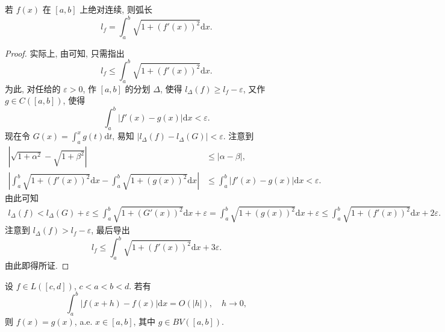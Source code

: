 \documentclass[../../main.tex]{subfiles}%
\begin{document}
\begin{example}
若 $f(x)$ 在 $[a,b]$ 上绝对连续, 则弧长
\[
l_f = \int_a^b \sqrt{1+(f'(x))^2}\mathrm{d}x.
\]
\end{example}
\begin{proof}
实际上, 由可知, 只需指出
\[
l_f \leqslant \int_a^b \sqrt{1+(f'(x))^2}\mathrm{d}x.
\]
为此, 对任给的 $\varepsilon>0$, 作 $[a,b]$ 的分划 $\Delta$, 使得 $l_\Delta(f)\geqslant l_f-\varepsilon$, 又作 $g\in C([a,b])$, 使得
\[
\int_a^b |f'(x)-g(x)|\mathrm{d}x < \varepsilon.
\]
现在令 $G(x) = \int_a^x g(t)\mathrm{d}t$, 易知 $|l_\Delta(f)-l_\Delta(G)| < \varepsilon$. 注意到
\begin{align*}
|\sqrt{1+\alpha^2}-\sqrt{1+\beta^2}| &\leqslant |\alpha-\beta|, \\
\left|\int_a^b \sqrt{1+(f'(x))^2}\mathrm{d}x - \int_a^b \sqrt{1+(g(x))^2}\mathrm{d}x\right|
&\leqslant \int_a^b |f'(x)-g(x)|\mathrm{d}x < \varepsilon.
\end{align*}
由此可知
\begin{align*}
l_\Delta(f) < l_\Delta(G) + \varepsilon \leqslant \int_a^b \sqrt{1+(G'(x))^2}\mathrm{d}x + \varepsilon 
= \int_a^b \sqrt{1+(g(x))^2}\mathrm{d}x + \varepsilon \leqslant \int_a^b \sqrt{1+(f'(x))^2}\mathrm{d}x + 2\varepsilon.
\end{align*}
注意到 $l_\Delta(f) > l_f-\varepsilon$, 最后导出
\[
l_f \leqslant \int_a^b \sqrt{1+(f'(x))^2}\mathrm{d}x + 3\varepsilon.
\]
由此即得所证.
\end{proof}

\begin{example}
设 $f\in L([c,d])$, $c<a<b<d$. 若有
\[
\int_a^b |f(x+h)-f(x)|\mathrm{d}x = O(|h|),\quad h\to 0,
\]
则 $f(x)=g(x)$, a.e. $x\in[a,b]$, 其中 $g\in  BV([a,b])$.
\end{example}
\end{document}
